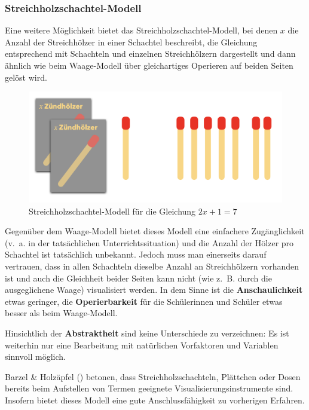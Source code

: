 \documentclass[
]{scrbook}
\theoremstyle{definition}
\theoremstyle{definition}
\theoremstyle{definition}
\theoremstyle{definition}
\theoremstyle{remark}
\begin{document}
\subsubsection{Streichholzschachtel-Modell}\label{streichholzschachtel-modell}

Eine weitere Möglichkeit bietet das Streichholzschachtel-Modell, bei denen \(x\) die Anzahl der Streichhölzer in einer Schachtel beschreibt, die Gleichung entsprechend mit Schachteln und einzelnen Streichhölzern dargestellt und dann ähnlich wie beim Waage-Modell über gleichartiges Operieren auf beiden Seiten gelöst wird.

\begin{figure}

{\centering \includegraphics[width=0.75\linewidth]{pictures/8-Streichholz} 

}

\caption{Streichholzschachtel-Modell für die Gleichung $2x+1 = 7$}\label{fig:Streichholz}
\end{figure}

Gegenüber dem Waage-Modell bietet dieses Modell eine einfachere Zugänglichkeit (v.~a. in der tatsächlichen Unterrichtssituation) und die Anzahl der Hölzer pro Schachtel ist tatsächlich unbekannt. Jedoch muss man einerseits darauf vertrauen, dass in allen Schachteln dieselbe Anzahl an Streichhölzern vorhanden ist und auch die Gleichheit beider Seiten kann nicht (wie z.~B. durch die ausgeglichene Waage) visualisiert werden. In dem Sinne ist die \textbf{Anschaulichkeit} etwas geringer, die \textbf{Operierbarkeit} für die Schülerinnen und Schüler etwas besser als beim Waage-Modell.

Hinsichtlich der \textbf{Abstraktheit} sind keine Unterschiede zu verzeichnen: Es ist weiterhin nur eine Bearbeitung mit natürlichen Vorfaktoren und Variablen sinnvoll möglich.

Barzel \& Holzäpfel () betonen, dass Streichholzschachteln, Plättchen oder Dosen bereits beim Aufstellen von Termen geeignete Visualisierungsinstrumente sind. Insofern bietet dieses Modell eine gute Anschlussfähigkeit zu vorherigen Erfahren.
\end{document}
